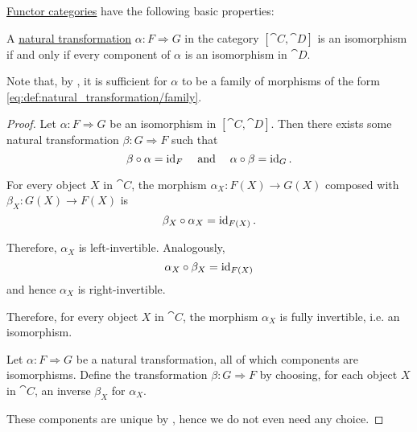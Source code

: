 \begin{proposition}\label{thm:def:functor_category/properties}
  \hyperref[def:functor_category]{Functor categories} have the following basic properties:
  \begin{thmenum}
     A \hyperref[def:natural_transformation]{natural transformation} \( \alpha: F \Rightarrow G \) in the category \( [\cat{C}, \cat{D}] \) is an isomorphism if and only if every component of \( \alpha \) is an isomorphism in \( \cat{D} \).

    Note that, by , it is sufficient for \( \alpha \) to be a family of morphisms of the form \eqref{eq:def:natural_transformation/family}.
  \end{thmenum}
\end{proposition}
\begin{proof}
  \SufficiencySubProof* Let \( \alpha: F \Rightarrow G \) be an isomorphism in \( [\cat{C}, \cat{D}] \). Then there exists some natural transformation \( \beta: G \Rightarrow F \) such that
  \begin{equation*}
    \beta \bincirc \alpha = \id_F \quad\T{and}\quad \alpha \bincirc \beta = \id_G.
  \end{equation*}

  For every object \( X \) in \( \cat{C} \), the morphism \( \alpha_X: F(X) \to G(X) \) composed with \( \beta_X: G(X) \to F(X) \) is
  \begin{equation*}
    \beta_X \bincirc \alpha_X = \id_{F(X)}.
  \end{equation*}

  Therefore, \( \alpha_X \) is left-invertible. Analogously,
  \begin{equation*}
    \alpha_X \bincirc \beta_X = \id_{F(X)}
  \end{equation*}
  and hence \( \alpha_X \) is right-invertible.

  Therefore, for every object \( X \) in \( \cat{C} \), the morphism \( \alpha_X \) is fully invertible, i.e. an isomorphism.

  \NecessitySubProof* Let \( \alpha: F \Rightarrow G \) be a natural transformation, all of which components are isomorphisms. Define the transformation \( \beta: G \Rightarrow F \) by choosing, for each object \( X \) in \( \cat{C} \), an inverse \( \beta_X \) for \( \alpha_X \).

  These components are unique by , hence we do not even need any choice.
\end{proof}
